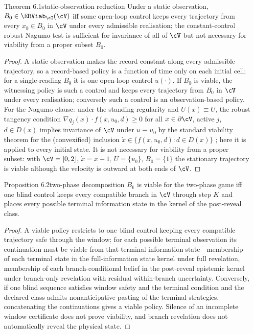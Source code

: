 \begin{restated}{Theorem 6.1}{static-observation reduction}
Under a static observation, $B_0\in\ERViab_\cI(\cV)$ iff some open-loop control keeps every trajectory from every $x_0\in B_0$ in $\cV$ under every admissible realisation; the constant-control robust Nagumo test is sufficient for invariance of all of $\cV$ but not necessary for viability from a proper subset $B_0$.
\end{restated}

\begin{proof}
A static observation makes the record constant along every admissible trajectory, so a record-based policy is a function of time only on each initial cell; for a single-reading $B_0$ it is one open-loop control $u(\cdot)$. If $B_0$ is viable, the witnessing policy is such a control and keeps every trajectory from $B_0$ in $\cV$ under every realisation; conversely such a control is an observation-based policy. For the Nagumo clause: under the standing regularity and $U(x)\equiv U$, the robust tangency condition $\nabla q_j(x)\cdot f(x,u_0,d)\ge0$ for all $x\in\partial\cV$, active $j$, $d\in D(x)$ implies invariance of $\cV$ under $u\equiv u_0$ by the standard viability theorem for the (convexified) inclusion $\dot x\in\{f(x,u_0,d):d\in D(x)\}$ \citep{nagumo1942,aubin1991}; here it is applied to every initial state. It is not necessary for viability from a proper subset: with $\cV=[0,2]$, $\dot x=x-1$, $U=\{u_0\}$, $B_0=\{1\}$ the stationary trajectory is viable although the velocity is outward at both ends of $\cV$.
\end{proof}

\begin{restated}{Proposition 6.2}{two-phase decomposition}
$B_0$ is viable for the two-phase game iff one blind control keeps every compatible branch in $\cV$ through step $K$ and places every possible terminal information state in the kernel of the post-reveal class.
\end{restated}

\begin{proof}
A viable policy restricts to one blind control keeping every compatible trajectory safe through the window; for each possible terminal observation its continuation must be viable from that terminal information state---membership of each terminal state in the full-information state kernel under full revelation, membership of each branch-conditional belief in the post-reveal epistemic kernel under branch-only revelation with residual within-branch uncertainty. Conversely, if one blind sequence satisfies window safety and the terminal condition and the declared class admits nonanticipative pasting of the terminal strategies, concatenating the continuations gives a viable policy. Silence of an incomplete window certificate does not prove viability, and branch revelation does not automatically reveal the physical state.
\end{proof}

